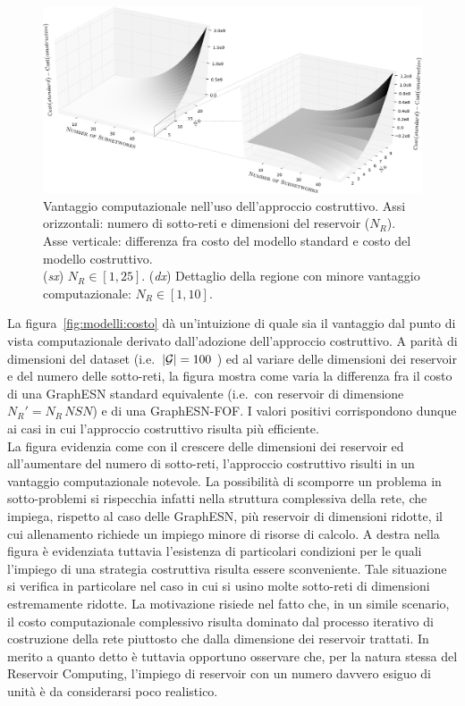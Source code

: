 \begin{figure}[tb]
\centering
\includegraphics[width=1.0\columnwidth]{img/costo-v2}
\medskip
\caption[Approccio costruttivo: vantaggio computazionale]{Vantaggio computazionale nell'uso dell'approccio costruttivo. Assi orizzontali: numero di sotto-reti e dimensioni del reservoir ($N_R$). Asse verticale: differenza fra costo del modello standard e costo del modello costruttivo.\\
(\emph{sx}) $N_R \in [1,25]$. (\emph{dx}) Dettaglio della regione con minore vantaggio computazionale: $N_R \in [1,10]$.}
\label{fig:modelli:costo}
\end{figure}

La figura~\vref{fig:modelli:costo} dà un'intuizione di quale sia il vantaggio dal punto di vista computazionale derivato dall'adozione dell'approccio costruttivo. A parità di dimensioni del dataset (i.e.\ $\lvert\mathcal{G}\rvert = 100$ ) ed al variare delle dimensioni dei reservoir e del numero delle sotto-reti, la figura mostra come varia la differenza fra il costo di una GraphESN standard equivalente (i.e.\ con reservoir di dimensione $N_R' = N_R\, \mathit{NSN}$) e di una GraphESN-FOF. I valori positivi corrispondono dunque ai casi in cui l'approccio costruttivo risulta più efficiente.\\
La figura evidenzia come con il crescere delle dimensioni dei reservoir ed all'aumentare del numero di sotto-reti, l'approccio costruttivo risulti in un vantaggio computazionale notevole. 
La possibilità di scomporre un problema in sotto-problemi si rispecchia infatti nella struttura complessiva della rete, che impiega, rispetto al caso delle GraphESN, più reservoir di dimensioni ridotte, il cui allenamento richiede un impiego minore di risorse di calcolo.
A destra nella figura è evidenziata tuttavia l'esistenza di particolari condizioni per le quali l'impiego di una strategia costruttiva risulta essere sconveniente. Tale situazione si verifica in particolare nel caso in cui si usino molte sotto-reti di dimensioni estremamente ridotte. La motivazione risiede nel fatto che, in un simile scenario, il costo computazionale complessivo risulta dominato dal processo iterativo di costruzione della rete piuttosto che dalla dimensione dei reservoir trattati. 
In merito a quanto detto è tuttavia opportuno osservare che, per la natura stessa del Reservoir Computing, l'impiego di reservoir con un numero davvero esiguo di unità è da considerarsi poco realistico.

